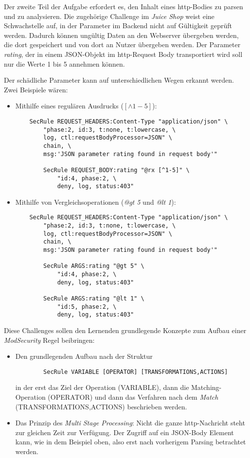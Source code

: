 Der zweite Teil der Aufgabe erfordert es, den Inhalt eines \ac{http}-Bodies zu parsen und zu analysieren.
Die zugehörige Challenge im \textit{Juice Shop} weist eine Schwachstelle auf, in der Parameter im Backend nicht auf Gültigkeit geprüft werden.
Dadurch können ungültig Daten an den Webserver übergeben werden, die dort gespeichert und von dort an Nutzer übergeben werden.
Der Parameter \textit{rating}, der in einem JSON-Objekt im \ac{http}-Request Body transportiert wird soll nur die Werte 1 bis 5 annehmen können.

Der schädliche Parameter kann auf unterschiedlichen Wegen erkannt werden.
Zwei Beispiele wären:\\

\begin{itemize}
    \item Mithilfe eines regulären Ausdrucks ($[\land 1-5]$):
    \begin{verbatim}
    SecRule REQUEST_HEADERS:Content-Type "application/json" \
        "phase:2, id:3, t:none, t:lowercase, \
        log, ctl:requestBodyProcessor=JSON" \
        chain, \
        msg:'JSON parameter rating found in request body'"
    
        SecRule REQUEST_BODY:rating "@rx [^1-5]" \
            "id:4, phase:2, \
            deny, log, status:403"
    \end{verbatim}

    \item Mithilfe von Vergleichsoperationen (\textit{@gt 5} und \textit{@lt 1}):
    \begin{verbatim}
    SecRule REQUEST_HEADERS:Content-Type "application/json" \
        "phase:2, id:3, t:none, t:lowercase, \
        log, ctl:requestBodyProcessor=JSON" \
        chain, \
        msg:'JSON parameter rating found in request body'"
        
        SecRule ARGS:rating "@gt 5" \
            "id:4, phase:2, \
            deny, log, status:403"
    
        SecRule ARGS:rating "@lt 1" \
            "id:5, phase:2, \
            deny, log, status:403"
    \end{verbatim}
\end{itemize}

Diese Challenges sollen den Lernenden grundlegende Konzepte zum Aufbau einer \textit{ModSecurity} Regel beibringen:
\begin{itemize}
    \item Den grundlegenden Aufbau nach der Struktur
    \begin{verbatim}
        SecRule VARIABLE [OPERATOR] [TRANSFORMATIONS,ACTIONS]
    \end{verbatim}
    in der erst das Ziel der Operation (VARIABLE), dann die Matching-Operation (OPERATOR) und dann das Verfahren nach dem \textit{Match} (TRANSFORMATIONS,ACTIONS) beschrieben werden.
    \item Das Prinzip des \textit{Multi Stage Processing}: Nicht die ganze \ac{http}-Nachricht steht zur gleichen Zeit zur Verfügung. Der Zugriff auf ein JSON-Body Element kann, wie in dem Beispiel oben, also erst nach vorherigem Parsing betrachtet werden.
\end{itemize}

